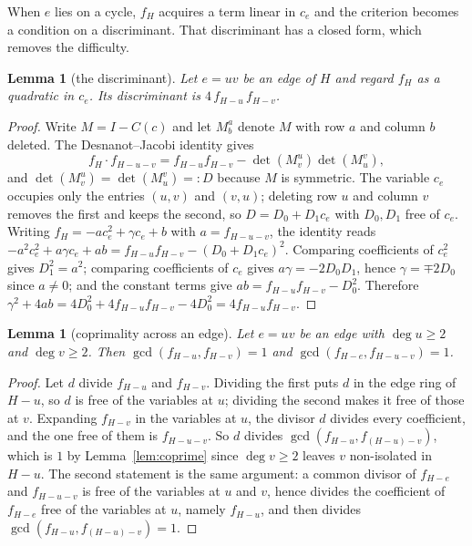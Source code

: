 \documentclass[11pt]{article}
\newtheorem{lemma}[theorem]{Lemma}
\theoremstyle{definition}
\theoremstyle{remark}
\theoremstyle{definition}
\begin{document}
When $e$ lies on a cycle, $f_H$ acquires a term linear in $c_e$ and the criterion becomes a
condition on a discriminant. That discriminant has a closed form, which removes the difficulty.

\begin{lemma}[the discriminant]\label{lem:disc}
Let $e=uv$ be an edge of $H$ and regard $f_H$ as a quadratic in $c_e$. Its discriminant is
$4\,f_{H-u}\,f_{H-v}$.
\end{lemma}

\begin{proof}
Write $M=I-C(c)$ and let $M^a_b$ denote $M$ with row $a$ and column $b$ deleted. The
Desnanot--Jacobi identity gives
\[
  f_H\cdot f_{H-u-v}=f_{H-u}f_{H-v}-\det(M^u_v)\det(M^v_u),
\]
and $\det(M^u_v)=\det(M^v_u)=:D$ because $M$ is symmetric. The variable $c_e$ occupies only the
entries $(u,v)$ and $(v,u)$; deleting row $u$ and column $v$ removes the first and keeps the
second, so $D=D_0+D_1c_e$ with $D_0,D_1$ free of $c_e$. Writing $f_H=-ac_e^2+\gamma c_e+b$ with
$a=f_{H-u-v}$, the identity reads
$-a^2c_e^2+a\gamma c_e+ab=f_{H-u}f_{H-v}-(D_0+D_1c_e)^2$. Comparing coefficients of $c_e^2$ gives
$D_1^2=a^2$; comparing coefficients of $c_e$ gives $a\gamma=-2D_0D_1$, hence $\gamma=\mp2D_0$
since $a\ne0$; and the constant terms give $ab=f_{H-u}f_{H-v}-D_0^2$. Therefore
$\gamma^2+4ab=4D_0^2+4f_{H-u}f_{H-v}-4D_0^2=4f_{H-u}f_{H-v}$.
\end{proof}

\begin{lemma}[coprimality across an edge]\label{lem:coprime2}
Let $e=uv$ be an edge with $\deg u\ge2$ and $\deg v\ge2$. Then
$\gcd(f_{H-u},f_{H-v})=1$ and $\gcd(f_{H-e},f_{H-u-v})=1$.
\end{lemma}

\begin{proof}
Let $d$ divide $f_{H-u}$ and $f_{H-v}$. Dividing the first puts $d$ in the edge ring of $H-u$, so
$d$ is free of the variables at $u$; dividing the second makes it free of those at $v$. Expanding
$f_{H-v}$ in the variables at $u$, the divisor $d$ divides every coefficient, and the one free of
them is $f_{H-u-v}$. So $d$ divides $\gcd(f_{H-u},f_{(H-u)-v})$, which is $1$ by
Lemma~\ref{lem:coprime} since $\deg v\ge2$ leaves $v$ non-isolated in $H-u$. The second statement
is the same argument: a common divisor of $f_{H-e}$ and $f_{H-u-v}$ is free of the variables at
$u$ and $v$, hence divides the coefficient of $f_{H-e}$ free of the variables at $u$, namely
$f_{H-u}$, and then divides $\gcd(f_{H-u},f_{(H-u)-v})=1$.
\end{proof}
\end{document}
